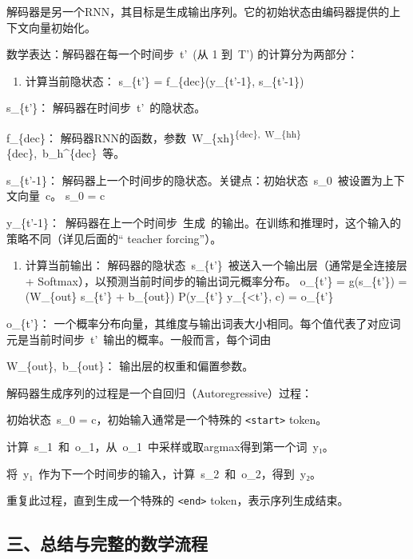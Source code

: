 解码器是另一个RNN，其目标是生成输出序列。它的初始状态由编码器提供的上下文向量初始化。

数学表达：解码器在每一个时间步~t'~(从 1 到~T') 的计算分为两部分：

\begin{enumerate}
\def\labelenumi{\alph{enumi})}
\tightlist
\item
{}
  计算当前隐状态：
  s\_\{t'\} = f\_\{dec\}(y\_\{t'-1\}, s\_\{t'-1\})
\end{enumerate}

s\_\{t'\}： 解码器在时间步~t'~的隐状态。

f\_\{dec\}： 解码器RNN的函数，参数~W\_\{xh\}\textsuperscript{\{dec\},~W\_\{hh\}}\{dec\},~b\_h\^{}\{dec\}~等。

s\_\{t'-1\}： 解码器上一个时间步的隐状态。关键点：初始状态~s\_0~被设置为上下文向量~c。
s\_0 = c

y\_\{t'-1\}：~解码器在上一个时间步~生成~的输出。在训练和推理时，这个输入的策略不同（详见后面的`` teacher forcing''）。

\begin{enumerate}
\def\labelenumi{\alph{enumi})}
\setcounter{enumi}{1}
\tightlist
\item
{}
  计算当前输出：
  解码器的隐状态~s\_\{t'\}~被送入一个输出层（通常是全连接层 + Softmax），以预测当前时间步的输出词元概率分布。
  o\_\{t'\} = g(s\_\{t'\}) = (W\_\{out\} s\_\{t'\} + b\_\{out\})
  P(y\_\{t'\} \textbar{} y\_\{\textless t'\}, c) = o\_\{t'\}
\end{enumerate}

o\_\{t'\}： 一个概率分布向量，其维度与输出词表大小相同。每个值代表了对应词元是当前时间步~t'~输出的概率。一般而言，每个词由

W\_\{out\},~b\_\{out\}： 输出层的权重和偏置参数。

解码器生成序列的过程是一个自回归（Autoregressive）过程：

初始状态~s\_0 = c，初始输入通常是一个特殊的 \texttt{\textless{}start\textgreater{}} token。

计算~s\_1~和~o\_1，从~o\_1~中采样或取argmax得到第一个词~y₁。

将~y₁~作为下一个时间步的输入，计算~s\_2~和~o\_2，得到~y₂。

重复此过程，直到生成一个特殊的 \texttt{\textless{}end\textgreater{}} token，表示序列生成结束。

\hypertarget{ux4e09ux603bux7ed3ux4e0eux5b8cux6574ux7684ux6570ux5b66ux6d41ux7a0b}{%
\subsection{三、总结与完整的数学流程}\label{ux4e09ux603bux7ed3ux4e0eux5b8cux6574ux7684ux6570ux5b66ux6d41ux7a0b}}

